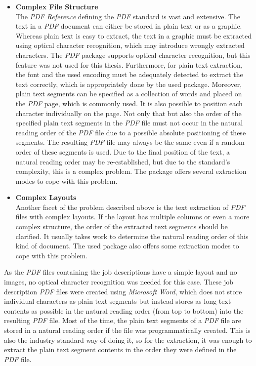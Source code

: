 \documentclass[draft,final]{thesisclass} %
\begin{document}
\begin{itemize}
    \item \textbf{Complex File Structure}\\
    The \textit{PDF Reference} defining the \textit{PDF} standard is vast and extensive. 
    The text in a \textit{PDF} document can either be stored in plain text or as a graphic.
    Whereas plain text is easy to extract, the text in a graphic must be extracted using optical character recognition, which may introduce wrongly extracted characters. 
    The \textit{PDF} package supports optical character recognition, but this feature was not used for this thesis.
    Furthermore, for plain text extraction, the font and the used encoding must be adequately detected to extract the text correctly, which is appropriately done by the used package.
    Moreover, plain text segments can be specified as a collection of words and placed on the \textit{PDF} page, which is commonly used. 
    It is also possible to position each character individually on the page.
    Not only that but also the order of the specified plain text segments in the \textit{PDF} file must not occur in the natural reading order of the \textit{PDF} file due to a possible absolute positioning of these segments. The resulting \textit{PDF} file may always be the same even if a random order of these segments is used.
    Due to the final position of the text, a natural reading order may be re-established, but due to the standard's complexity, this is a complex problem. 
    The package offers several extraction modes to cope with this problem.
    \item \textbf{Complex Layouts}\\
    Another facet of the problem described above is the text extraction of \textit{PDF} files with complex layouts.
    If the layout has multiple columns or even a more complex structure, the order of the extracted text segments should be clarified. 
    It usually takes work to determine the natural reading order of this kind of document.
    The used package also offers some extraction modes to cope with this problem.
\end{itemize}
As the \textit{PDF} files containing the job descriptions have a simple layout and no images, no optical character recognition was needed for this case.
These job description \textit{PDF} files were created using \textit{Microsoft Word}, which does not store individual characters as plain text segments but instead stores as long text contents as possible in the natural reading order (from top to bottom) into the resulting \textit{PDF} file.
Most of the time, the plain text segments of a \textit{PDF} file are stored in a natural reading order if the file was programmatically created.
This is also the industry standard way of doing it, so for the extraction, it was enough to extract the plain text segment contents in the order they were defined in the \textit{PDF} file.
\end{document}
